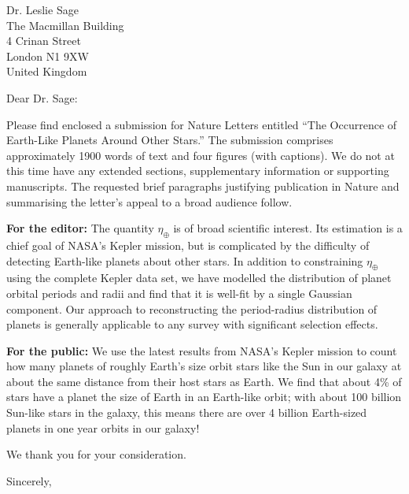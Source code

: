 \documentclass{letter}
\begin{document}
\begin{letter}{Dr. Leslie Sage\\The Macmillan Building\\4 Crinan Street\\London N1 9XW\\United Kingdom}

  \opening{Dear Dr. Sage:}

  Please find enclosed a submission for Nature Letters entitled ``The
  Occurrence of Earth-Like Planets Around Other Stars.''  The
  submission comprises approximately 1900 words of text and four
  figures (with captions).  We do not at this time have any extended
  sections, supplementary information or supporting manuscripts.  The
  requested brief paragraphs justifying publication in Nature and
  summarising the letter's appeal to a broad audience follow.

  \textbf{For the editor:} The quantity $\eta_\oplus$ is of broad
  scientific interest.  Its estimation is a chief goal of NASA's
  Kepler mission, but is complicated by the difficulty of detecting
  Earth-like planets about other stars.  In addition to constraining
  $\eta_\oplus$ using the complete Kepler data set, we have modelled
  the distribution of planet orbital periods and radii and find that
  it is well-fit by a single Gaussian component.  Our approach to
  reconstructing the period-radius distribution of planets is
  generally applicable to any survey with significant selection
  effects.

  \textbf{For the public:} We use the latest results from NASA's
  Kepler mission to count how many planets of roughly Earth's size
  orbit stars like the Sun in our galaxy at about the same distance
  from their host stars as Earth.  We find that about 4\% of stars
  have a planet the size of Earth in an Earth-like orbit; with about
  100 billion Sun-like stars in the galaxy, this means there are over
  4 billion Earth-sized planets in one year orbits in our galaxy!  

  We thank you for your consideration.

  \closing{Sincerely,}

  
\end{letter}
\end{document}
